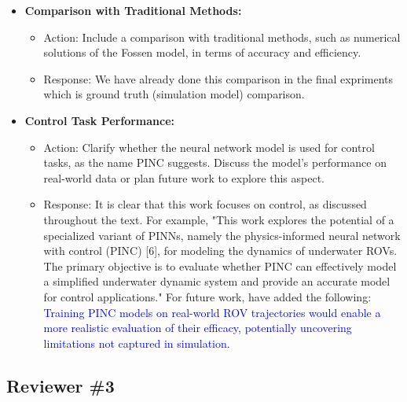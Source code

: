 \documentclass{article}
\begin{document}
\begin{itemize}
    \item \textbf{Comparison with Traditional Methods:} 
    \begin{itemize}
        \item Action: Include a comparison with traditional methods, such as numerical solutions of the Fossen model, in terms of accuracy and efficiency.
        \item Response: We have already done this comparison in the final expriments which is ground truth  (simulation model) comparison. 
    \end{itemize}
    
    \item \textbf{Control Task Performance:} 
    \begin{itemize}
        \item Action: Clarify whether the neural network model is used for control tasks, as the name PINC suggests. Discuss the model’s performance on real-world data or plan future work to explore this aspect.
        \item Response: It is clear that this work focuses on control, as discussed throughout the text. For example, "This work explores the potential of a specialized variant of PINNs, namely the physics-informed neural network with control (PINC) [6], for modeling the dynamics of underwater ROVs. The primary objective is to evaluate whether PINC can effectively model a simplified underwater dynamic system and provide an accurate model for control applications." For future work, have added the following: \textcolor{blue}{Training PINC models on real-world ROV trajectories would enable a more realistic evaluation of their efficacy, potentially uncovering limitations not captured in simulation.}

       
    \end{itemize}
\end{itemize}

\subsection*{Reviewer \#3}
\end{document}
